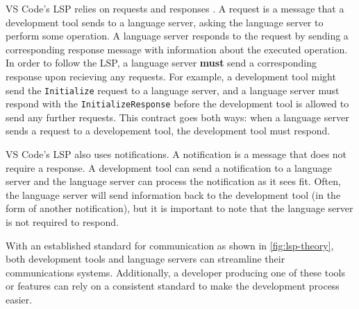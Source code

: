 \documentclass{article}
\begin{document}
VS Code's LSP relies on requests and responses \cite{Microsoft_2023i}. A request is a message that a development tool sends to a language server, asking the language server to perform some operation. A language server responds to the request by sending a corresponding response message with information about the executed operation. In order to follow the LSP, a language server \textbf{must} send a corresponding response upon recieving any requests. For example, a development tool might send the \lstinline{Initialize} request to a language server, and a language server must respond with the \lstinline{InitializeResponse} before the development tool is allowed to send any further requests. This contract goes both ways: when a language server sends a request to a developement tool, the development tool must respond.

VS Code's LSP also uses notifications. A notification is a message that does not require a response. A development tool can send a notification to a language server and the language server can process the notification as it sees fit. Often, the language server will send information back to the development tool (in the form of another notification), but it is important to note that the language server is not required to respond. 

With an established standard for communication as shown in \ref{fig:lsp-theory}, both development tools and language servers can streamline their communications systems. Additionally, a developer producing one of these tools or features can rely on a consistent standard to make the development process easier. 
\end{document}
